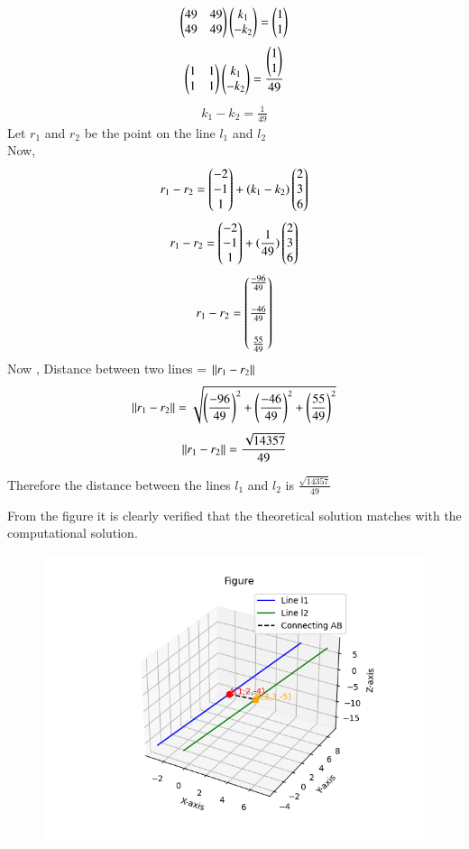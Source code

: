 \documentclass[journal]{IEEEtran}
\theoremstyle{remark}
\begin{document}
\begin{align}
   \begin{pmatrix}49&49\\49&49\end{pmatrix}\begin{pmatrix}k_1\\-k_2\end{pmatrix}=\begin{pmatrix}1\\1\end{pmatrix}
\end{align}
\begin{align}
   \begin{pmatrix}1&1\\1&1\end{pmatrix}\begin{pmatrix}k_1\\-k_2\end{pmatrix}=\frac{\begin{pmatrix}1\\1\end{pmatrix}}{49}
\end{align}
\begin{align}
     k_1-k_2=\frac{1}{49}
\end{align}
Let $r_1$ and $r_2$ be the point on the line $l_1$ and $l_2$\\
Now,
\begin{align}
    r_1-r_2=\begin{pmatrix}-2\\-1\\1\end{pmatrix}+(k_1-k_2)\begin{pmatrix}2\\3\\6\end{pmatrix}
\end{align}
\begin{align}
      r_1-r_2=\begin{pmatrix}-2\\-1\\1\end{pmatrix}+(\frac{1}{49})\begin{pmatrix}2\\3\\6\end{pmatrix}
\end{align}
\begin{align}
       r_1-r_2=\begin{pmatrix}\frac{-96}{49}\\\\\frac{-46}{49}\\\\\frac{55}{49}\end{pmatrix}
\end{align}
Now , Distance between two lines = $\left\lVert r_1-r_2\right\rVert$
\begin{align}
    \left\lVert r_1-r_2\right\rVert=\sqrt{\left(\frac{-96}{49}\right)^2+\left(\frac{-46}{49}\right)^2+\left(\frac{55}{49}\right)^2}
\end{align}
\begin{align}
       \left\lVert r_1-r_2\right\rVert=\frac{\sqrt{14357}}{49}
\end{align}


Therefore the distance between the lines $l_1$ and $l_2$ is $\frac{\sqrt{14357}}{49}$

From the figure it is clearly verified that the theoretical solution matches with the computational solution.\\
\begin{figure}[h]
    \centering
    \includegraphics[height=0.5\textheight, keepaspectratio]{figs/figure1.png}
    \label{figure_1}
\end{figure}
\end{document}
